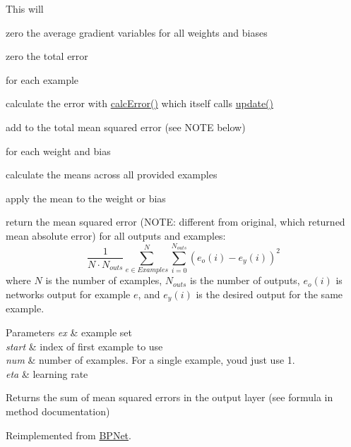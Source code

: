 This will
\begin{DoxyItemize}
\item zero the average gradient variables for all weights and biases
\item zero the total error
\item for each example
\begin{DoxyItemize}
\item calculate the error with \hyperlink{classUESNet_afce4ee930898f0b93c147167adc9bac6}{calc\+Error()} which itself calls \hyperlink{classUESNet_a1d05fcd3ce9f188db8841a9d6fc6c56c}{update()}
\item add to the total mean squared error (see N\+O\+TE below)
\end{DoxyItemize}
\item for each weight and bias
\begin{DoxyItemize}
\item calculate the means across all provided examples
\item apply the mean to the weight or bias
\end{DoxyItemize}
\item return the mean squared error (N\+O\+TE\+: different from original, which returned mean absolute error) for all outputs and examples\+: \[ \frac{1}{N\cdot N_{outs}}\sum^N_{e \in Examples} \sum_{i=0}^{N_{outs}} (e_o(i) - e_y(i))^2 \] where $N$ is the number of examples, $N_{outs}$ is the number of outputs, $e_o(i)$ is network\textquotesingle{}s output for example $e$, and $e_y(i)$ is the desired output for the same example. 
\begin{DoxyParams}{Parameters}
{\em ex} & example set \\
\hline
{\em start} & index of first example to use \\
\hline
{\em num} & number of examples. For a single example, you\textquotesingle{}d just use 1. \\
\hline
{\em eta} & learning rate \\
\hline
\end{DoxyParams}
\begin{DoxyReturn}{Returns}
the sum of mean squared errors in the output layer (see formula in method documentation) 
\end{DoxyReturn}

\end{DoxyItemize}

Reimplemented from \hyperlink{classBPNet_a3f820464f3338ed7305e9de950cd2103}{B\+P\+Net}.




